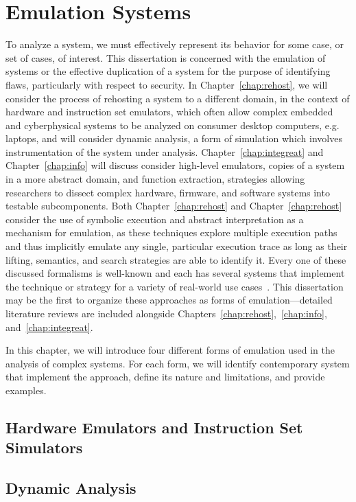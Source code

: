 \chapter{Emulation Systems}
\label{chap:emulation}

To analyze a system, we must effectively represent its behavior for some case, or set of cases, of interest.
This dissertation is concerned with the emulation of systems or the effective duplication of a system for the purpose of identifying flaws, particularly with respect to security.
In Chapter~\ref{chap:rehost}, we will consider the process of rehosting a system to a different domain, in the context of hardware and instruction set emulators, which often allow complex embedded and cyberphysical systems to be analyzed on consumer desktop computers, e.g. laptops, and will consider dynamic analysis, a form of simulation which involves instrumentation of the system under analysis.
Chapter~\ref{chap:integreat} and Chapter~\ref{chap:info} will discuss consider high-level emulators, copies of a system in a more abstract domain, and function extraction, strategies allowing researchers to dissect complex hardware, firmware, and software systems into testable subcomponents.
Both Chapter~\ref{chap:rehost} and Chapter~\ref{chap:rehost} consider the use of symbolic execution and abstract interpretation as a mechanism for emulation, as these techniques explore multiple execution paths and thus implicitly emulate any single, particular execution trace as long as their lifting, semantics, and search strategies are able to identify it.
Every one of these discussed formalisms is well-known and each has several systems that implement the technique or strategy for a variety of real-world use cases~\cite{}.
This dissertation may be the first to organize these approaches as forms of emulation---detailed literature reviews are included alongside Chapters~\ref{chap:rehost},\ \ref{chap:info}, and~\ref{chap:integreat}.

In this chapter, we will introduce four different forms of emulation used in the analysis of complex systems.
For each form, we will identify contemporary system that implement the approach, define its nature and limitations, and provide examples.

\section{Hardware Emulators and Instruction Set Simulators}
\label{sec:hardemu}

\section{Dynamic Analysis}


